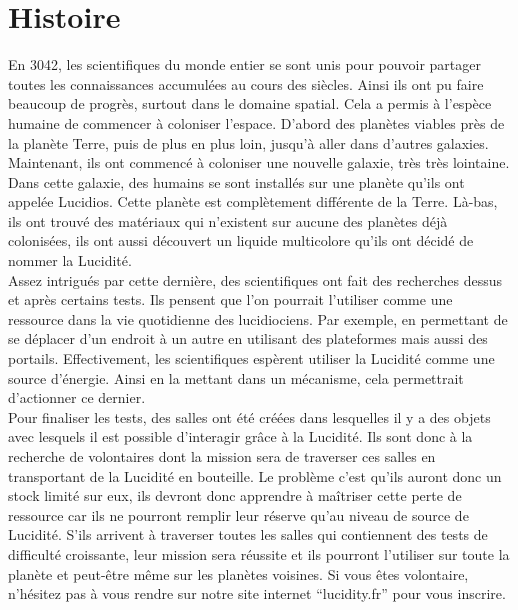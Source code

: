 \documentclass[12pt]{article}
\begin{document}
\pagestyle{fancy}
\rfoot{\leftmark}
\renewcommand{\footrulewidth}{0.4pt}

\tableofcontents

\newpage

\section{Histoire}

\quad

En 3042, les scientifiques du monde entier se sont unis pour pouvoir partager toutes les connaissances accumulées au cours des siècles. Ainsi ils ont pu faire beaucoup de progrès, surtout dans le domaine spatial. Cela a permis à l’espèce humaine de commencer à coloniser l’espace. D’abord des planètes viables près de la planète Terre, puis de plus en plus loin, jusqu’à aller dans d’autres galaxies. Maintenant, ils ont commencé à coloniser une nouvelle galaxie, très très lointaine. Dans cette galaxie, des humains se sont installés sur une planète qu’ils ont appelée Lucidios. Cette planète est complètement différente de la Terre. Là-bas, ils ont trouvé des matériaux qui n’existent sur aucune des planètes déjà colonisées, ils ont aussi découvert un liquide multicolore qu’ils ont décidé de nommer la Lucidité.\\

Assez intrigués par cette dernière, des scientifiques ont fait des recherches dessus et après certains tests. Ils pensent que l’on pourrait l’utiliser comme une ressource dans la vie quotidienne des lucidiociens. Par exemple, en permettant de se déplacer d’un endroit à un autre en utilisant des plateformes mais aussi des portails. Effectivement, les scientifiques espèrent utiliser la Lucidité comme une source d’énergie. Ainsi en la mettant dans un mécanisme, cela permettrait d’actionner ce dernier. \\

Pour finaliser les tests, des salles ont été créées dans lesquelles il y a des objets avec lesquels il est possible d’interagir grâce à la Lucidité. Ils sont donc à la recherche de volontaires dont la mission sera de traverser ces salles en transportant de la Lucidité en bouteille. Le problème c’est qu’ils auront donc un stock limité sur eux, ils devront donc apprendre à maîtriser cette perte de ressource car ils ne pourront remplir leur réserve qu’au niveau de source de Lucidité. S’ils arrivent à traverser toutes les salles qui contiennent  des tests de difficulté croissante, leur mission sera réussite et ils pourront l’utiliser sur toute la planète et peut-être même sur les planètes voisines. Si vous êtes volontaire, n’hésitez pas à vous rendre sur notre site internet “lucidity.fr” pour vous inscrire.
\end{document}
